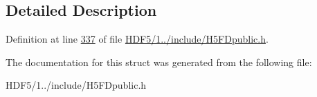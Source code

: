 \subsection{Detailed Description}


Definition at line \hyperlink{_h_d_f5_21_810_81_2include_2_h5_f_dpublic_8h_source_l00337}{337} of file \hyperlink{_h_d_f5_21_810_81_2include_2_h5_f_dpublic_8h_source}{H\+D\+F5/1../include/\+H5\+F\+Dpublic.\+h}.



The documentation for this struct was generated from the following file\+:\begin{DoxyCompactItemize}
\item 
H\+D\+F5/1../include/\+H5\+F\+Dpublic.\+h\end{DoxyCompactItemize}
